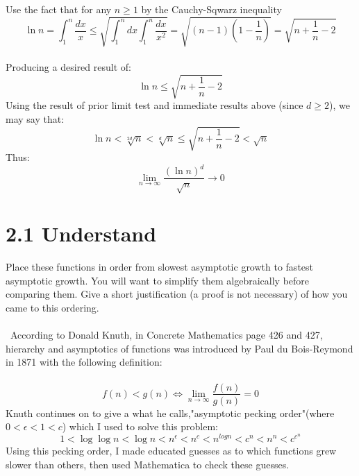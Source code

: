 \documentclass[12pt]{article}
\begin{document}
Use the fact that for any \begin{math} n  \geq 1\end{math} by the Cauchy-Sqwarz inequality\
\[\ln{n} = \int_{1}^{n} \frac{dx}{x} \leq \sqrt{\int_{1}^{n} dx \int_{1}^{n} \frac{dx}{x^2}} = \sqrt{(n-1)(1-\frac{1}{n})} = \sqrt{n + \frac{1}{n} - 2}\]\\
Producing a desired result of:
\[\ln{n} \leq \sqrt{n + \frac{1}{n} - 2}\]
Using the result of prior limit test and immediate results above (since \begin{math}d \geq 2\end{math}), we may say that:
\[\ln{n} < \sqrt[2d]{n} < \sqrt[d]{n} \leq \sqrt{n + \frac{1}{n} - 2} < \sqrt{n}\]
Thus:
\[\lim_{n\to\infty} \frac{(\ln{n})^d}{\sqrt{n}} \rightarrow 0\]
\section{2.1 Understand}
Place these functions in order from slowest asymptotic growth to fastest asymptotic growth. You will want to simplify them algebraically before comparing them. Give a short justification (a proof is not necessary) of how you came to this ordering.\\\\\
According to Donald Knuth, in Concrete Mathematics page 426 and 427, hierarchy and asymptotics of functions was introduced by Paul du Bois-Reymond in 1871 with the following definition:\\\\ 
\[f(n) < g(n) \Longleftrightarrow \lim_{n\to\infty} \frac{f(n)}{g(n)} = 0\]
Knuth continues on to give a what he calls,"asymptotic pecking order"(where \begin{math}0 < \epsilon < 1 < c\end{math}) which I used to solve this problem:
\[1 < \log{\log{n}} < \log{n} < n^{\epsilon} < n^c < n^{log{n}} < c^n < n^n < c^{c^{n}}\]
Using this pecking order, I made educated guesses as to which functions grew slower than others, then used Mathematica to check these guesses.
\end{document}
